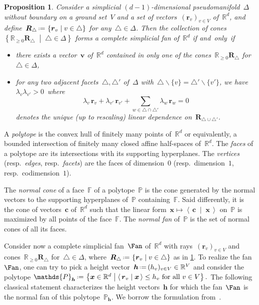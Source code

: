 \documentclass{amsart}
\newtheorem{proposition}[theorem]{Proposition}
\theoremstyle{definition}
\newcommand{\R}{\mathbb{R}} %
\renewcommand{\b}[1]{{\boldsymbol{#1}}} %
\newcommand{\set}[2]{\left\{ #1 \;\middle|\; #2 \right\}} %
\newcommand{\ssm}{\smallsetminus} %
\newcommand{\dotprod}[2]{\left\langle \, #1 \; \middle| \; #2 \, \right\rangle} %
\newcommand{\eqdef}{\mbox{\,\raisebox{0.2ex}{\scriptsize\ensuremath{\mathrm:}}\ensuremath{=}\,}} %
\newcommand{\darkblue}{\color{darkblue}} %
\newcommand{\defn}[1]{\textsl{\darkblue #1}} %
\newcommand{\polytope}[1]{\mathds{#1}} %
\begin{document}
\begin{proposition}
\label{prop:characterizationFan}
Consider a simplicial $(d-1)$-dimensional pseudomanifold~$\Delta$ without boundary on a ground set~$V$ and a set of vectors~$(\b{r}_v)_{v \in V}$ of~$\R^d$, and define~$\b{R}_\triangle \eqdef \set{\b{r}_v}{v \in \triangle}$ for any~$\triangle \in \Delta$.
Then the collection of cones~$\set{\R_{\ge 0}\b{R}_\triangle}{\triangle \in \Delta}$ forms a complete simplicial fan of~$\R^d$ if and~only~if
\begin{itemize}
\item there exists a vector~$\b{v}$ of~$\R^d$ contained in only one of the cones~$\R_{\ge 0}\b{R}_\triangle$ for~$\triangle \in \Delta$,
\item for any two adjacent facets~$\triangle, \triangle'$ of~$\Delta$ with~$\triangle \ssm \{v\} = \triangle' \ssm \{v'\}$, we have~$\lambda_v \lambda_{v'} > 0$~where
\[
\lambda_v \, \b{r}_v + \lambda_{v'} \, \b{r}_{v'} + \sum_{w \in \triangle \cap \triangle'} \lambda_w \, \b{r}_w = 0
\]
denotes the unique (up to rescaling) linear dependence on~$\b{R}_{\triangle \cup \triangle'}$.
\end{itemize}
\end{proposition}

A \defn{polytope} is the convex hull of finitely many points of~$\R^d$ or equivalently, a bounded intersection of finitely many closed affine half-spaces of~$\R^d$.
The \defn{faces} of a polytope are its intersections with its supporting hyperplanes.
The \defn{vertices} (resp.~\defn{edges}, resp.~\defn{facets}) are the faces of dimension~$0$ (resp.~dimension~$1$, resp.~codimension~$1$).

The \defn{normal cone} of a face~$\polytope{F}$ of a polytope~$\polytope{P}$ is the cone generated by the normal vectors to the supporting hyperplanes of~$\polytope{P}$ containing~$\polytope{F}$.
Said differently, it is the cone of vectors~$\b{c}$ of~$\R^d$ such that the linear form~$\b{x} \mapsto \dotprod{\b{c}}{\b{x}}$ on~$\polytope{P}$ is maximized by all points of the face~$\polytope{F}$.
The \defn{normal fan} of~$\polytope{P}$ is the set of normal cones of all its faces.

\enlargethispage{.5cm}
Consider now a complete simplicial fan~$\Fan$ of~$\R^d$ with rays~$(\b{r}_v)_{v \in V}$ and cones~$\R_{\ge 0} \b{R}_\triangle$ for~${\triangle \in \Delta}$, where~$\b{R}_\triangle \eqdef \set{\b{r}_v}{v \in \triangle}$ as in \cref{prop:characterizationFan}.
To realize the fan~$\Fan$, one can try to pick a height vector~$\b{h} \eqdef (h_v)_{v \in V} \in \R^V$ and consider the polytope
\(
\polytope{P}_{\b{h}} \eqdef \set{\b{x} \in \R^d}{\dotprod{\b{r}_v}{\b{x}} \le h_v \text{ for all } v \in V}.
\)
The following classical statement characterizes the height vectors~$\b{h}$ for which the fan~$\Fan$ is the normal fan of this polytope~$\polytope{P}_{\b{h}}$.
We borrow the formulation from~\cite[Lem.~2.1]{ChapotonFominZelevinsky}.
\end{document}

